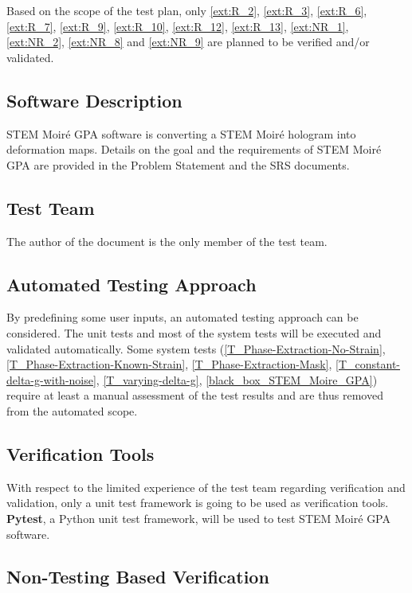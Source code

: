 \documentclass[12pt, titlepage]{article}
\newcommand{\progname}{STEM Moir{\'e} GPA}
\begin{document}
Based on the scope of the test plan, only \cref{ext:R_2}, \cref{ext:R_3}, \cref{ext:R_6}, \cref{ext:R_7}, \cref{ext:R_9}, \cref{ext:R_10}, \cref{ext:R_12}, \cref{ext:R_13}, \cref{ext:NR_1}, \cref{ext:NR_2}, \cref{ext:NR_8} and \cref{ext:NR_9} are planned to be verified and/or validated. 
	
\subsection{Software Description}

\progname{} software is converting a STEM Moir{\'e} hologram into deformation maps. Details on the goal and the requirements of \progname{} are provided in the Problem Statement and the SRS documents.

\subsection{Test Team}

The author of the document is the only member of the test team.

\subsection{Automated Testing Approach}

By predefining some user inputs, an automated testing approach can be considered. The unit tests and most of the system tests will be executed and validated automatically. Some system tests (\cref{T_Phase-Extraction-No-Strain}, \cref{T_Phase-Extraction-Known-Strain}, \cref{T_Phase-Extraction-Mask}, \cref{T_constant-delta-g-with-noise}, \cref{T_varying-delta-g}, \cref{black_box_STEM_Moire_GPA}) require at least a manual assessment of the test results and are thus removed from the automated scope.

\subsection{Verification Tools}

With respect to the limited experience of the test team regarding verification and validation, only a unit test framework is going to be used as verification tools. \textbf{Pytest}, a Python unit test framework, will be used to test \progname{} software.

\subsection{Non-Testing Based Verification}
\end{document}
